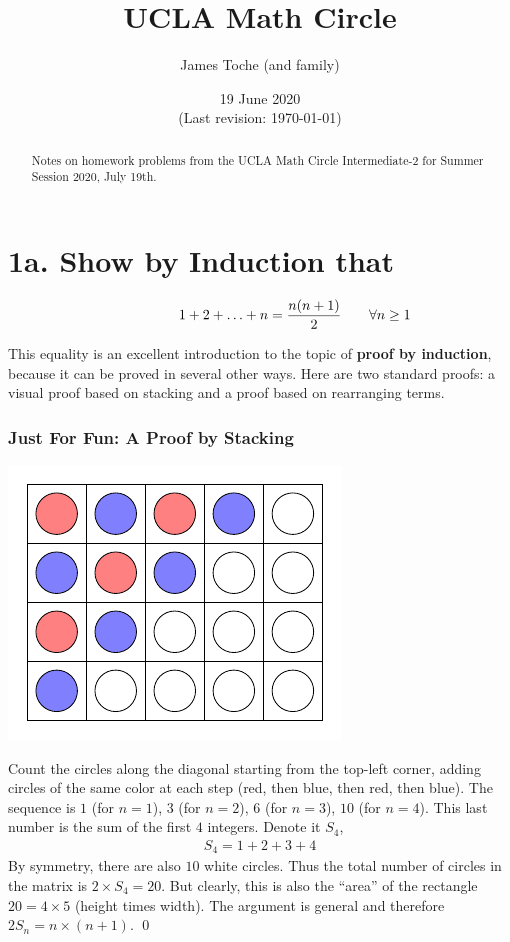 \documentclass[12pt]{article}
\title{UCLA Math Circle}
\author{James Toche (and family)}
\date{19 June 2020 \\(Last revision: \today)}
\begin{document}
\begin{minipage}{\textwidth}
\maketitle
\begin{abstract}
Notes on homework problems from the UCLA Math Circle Intermediate-2 for Summer Session 2020, July 19th. 
\end{abstract}
\end{minipage}

\section*{1a. Show by Induction that}
\begin{question}
  \begin{align*}
  1 + 2 + \ldots + n = \frac{n(n+1)}{2} \mathrlap{\qquad \forall n\geq 1}
  \end{align*}
\end{question}

This equality is an excellent introduction to the topic of \textbf{proof by induction}, because it can be proved in several other ways. Here are two standard proofs: a visual proof based on stacking and a proof based on rearranging terms. 
\subsubsection*{Just For Fun: A Proof by Stacking}
\begin{center}
\includegraphics{tikz-matrix-nodes-circles-2}
\end{center}
Count the circles along the diagonal starting from the top-left corner, adding circles of the same color at each step (red, then blue, then red, then blue). The sequence is $1$ (for $n=1$), $3$ (for $n=2$), $6$ (for $n=3$), $10$ (for $n=4$). This last number is the sum of the first $4$ integers. Denote it $S_{4}$,
\begin{align*}
S_{4} = 1 + 2 + 3 + 4
\end{align*}
By symmetry, there are also $10$ white circles. Thus the total number of circles in the matrix is $2 \times S_{4} = 20$. But clearly, this is also the ``area'' of the rectangle $20=4\times5$ (height times width). The argument is general and therefore $2 S_{n} = n\times(n+1)$.  \qed
\end{document}
